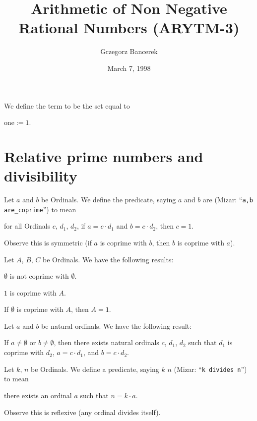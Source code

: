 \documentclass{article}
\title{Arithmetic of Non Negative Rational Numbers (ARYTM-3)}
\author{Grzegorz Bancerek}
\date{March 7, 1998}
\begin{document}
\maketitle

\begin{definition}
We define the term  to be the set equal to
\begin{defn}
\item $\mbox{one}:=1$.
\end{defn}
\end{definition}

\section{Relative prime numbers and divisibility}

\begin{definition}
Let $a$ and $b$ be Ordinals.
We define the predicate, saying $a$ and $b$ are 
(Mizar: ``\verb#a,b are_coprime#'') to mean
\begin{defn}
\item for all Ordinals $c$, $d_{1}$, $d_{2}$, if $a=c\cdot d_{1}$ and
  $b=c\cdot d_{2}$, then $c=1$.
\end{defn}
Observe this is symmetric (if $a$ is coprime with $b$, then $b$ is
coprime with $a$).
\end{definition}

Let $A$, $B$, $C$ be Ordinals. We have the following results:
\begin{thm}
\item\label{arytm3:1} $\emptyset$ is not coprime with $\emptyset$.
\item\label{arytm3:2} $1$ is coprime with $A$.
\item\label{arytm3:3} If $\emptyset$ is coprime with $A$, then $A=1$.
\end{thm}

Let $a$ and $b$ be natural ordinals. We have
the following result:
\begin{thm}
\item\label{arytm3:4} If $a\neq\emptyset$ or $b\neq\emptyset$, then
  there exists natural ordinals $c$, $d_{1}$, $d_{2}$ such that $d_{1}$
  is coprime with $d_{2}$, $a=c\cdot d_{1}$, and $b=c\cdot d_{2}$.
\end{thm}

\begin{definition}
Let $k$, $n$ be Ordinals.
We define a predicate, saying $k$  $n$
(Mizar: ``\verb#k divides n#'') to mean
\begin{defn}
\item there exists an ordinal $a$ such that $n=k\cdot a$.
\end{defn}
Observe this is reflexive (any ordinal divides itself).
\end{definition}
\end{document}
